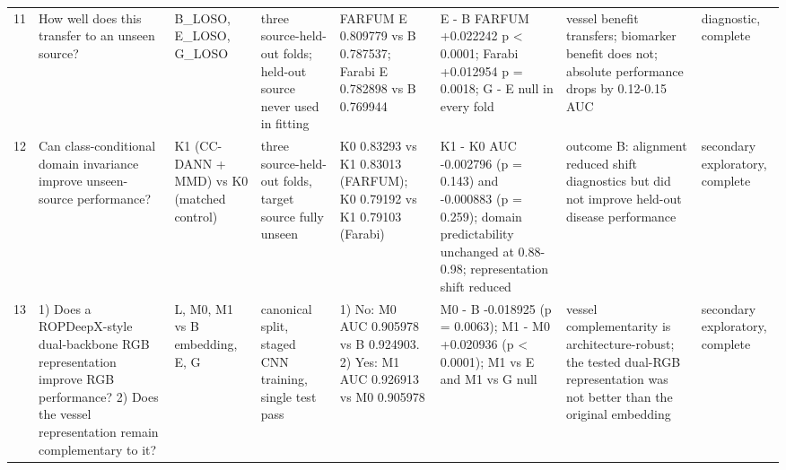 \begin{table}[htbp]
\begin{tabular}{lp{3.4cm}p{3.0cm}p{3.2cm}p{3.2cm}p{4.0cm}p{3.4cm}p{2.2cm}}
11 & How well does this transfer to an unseen source? & B\_LOSO, E\_LOSO, G\_LOSO & three source-held-out folds; held-out source never used in fitting & FARFUM E 0.809779 vs B 0.787537; Farabi E 0.782898 vs B 0.769944 & E - B FARFUM +0.022242 p < 0.0001; Farabi +0.012954 p = 0.0018; G - E null in every fold & vessel benefit transfers; biomarker benefit does not; absolute performance drops by 0.12-0.15 AUC & diagnostic, complete \\
12 & Can class-conditional domain invariance improve unseen-source performance? & K1 (CC-DANN + MMD) vs K0 (matched control) & three source-held-out folds, target source fully unseen & K0 0.83293 vs K1 0.83013 (FARFUM); K0 0.79192 vs K1 0.79103 (Farabi) & K1 - K0 AUC -0.002796 (p = 0.143) and -0.000883 (p = 0.259); domain predictability unchanged at 0.88-0.98; representation shift reduced & outcome B: alignment reduced shift diagnostics but did not improve held-out disease performance & secondary exploratory, complete \\
13 & 1) Does a ROPDeepX-style dual-backbone RGB representation improve RGB performance? 2) Does the vessel representation remain complementary to it? & L, M0, M1 vs B embedding, E, G & canonical split, staged CNN training, single test pass & 1) No: M0 AUC 0.905978 vs B 0.924903. 2) Yes: M1 AUC 0.926913 vs M0 0.905978 & M0 - B -0.018925 (p = 0.0063); M1 - M0 +0.020936 (p < 0.0001); M1 vs E and M1 vs G null & vessel complementarity is architecture-robust; the tested dual-RGB representation was not better than the original embedding & secondary exploratory, complete \\
\bottomrule
\end{tabular}
\end{table}
